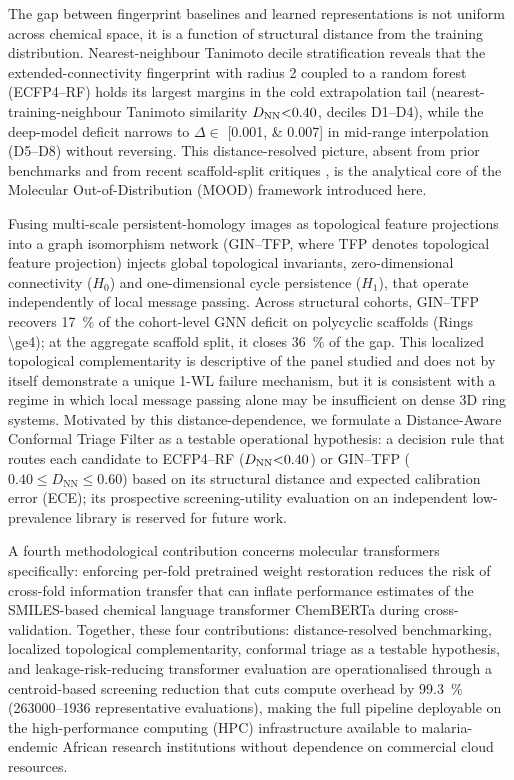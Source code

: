 \documentclass[11pt,a4paper]{article}
\begin{document}
The gap between fingerprint baselines and learned representations is not uniform across chemical space, it is a function of structural distance from the training distribution. Nearest-neighbour Tanimoto decile stratification reveals that the extended-connectivity fingerprint with radius \num{2} coupled to a random forest (ECFP4--RF) holds its largest margins in the cold extrapolation tail (nearest-training-neighbour Tanimoto similarity $D_{\mathrm{NN}}\num{<0.40}$, deciles D1--D4), while the deep-model deficit narrows to $\Delta \in$ [\numlist{0.001; 0.007}] in mid-range interpolation (D5--D8) without reversing. This distance-resolved picture, absent from prior benchmarks \citep{guo_ding_2026,benchmark_pretrained_2025} and from recent scaffold-split critiques \citep{guo2024scaffold,scaffold_frontier_2026}, is the analytical core of the Molecular Out-of-Distribution (MOOD) framework introduced here.

Fusing multi-scale persistent-homology images \citep{adams2017persistence} as topological feature projections into a graph isomorphism network (GIN--TFP, where TFP denotes topological feature projection) injects global topological invariants, zero-dimensional connectivity ($H_0$) and one-dimensional cycle persistence ($H_1$), that operate independently of local message passing. Across structural cohorts, GIN--TFP recovers \qty{17}{\percent} of the cohort-level GNN deficit on polycyclic scaffolds (Rings \num{\ge4}); at the aggregate scaffold split, it closes \qty{36}{\percent} of the gap. This localized topological complementarity is descriptive of the panel studied and does not by itself demonstrate a unique 1-WL failure mechanism, but it is consistent with a regime in which local message passing alone may be insufficient on dense 3D ring systems. Motivated by this distance-dependence, we formulate a Distance-Aware Conformal Triage Filter as a testable operational hypothesis: a decision rule that routes each candidate to ECFP4--RF ($D_{\mathrm{NN}}\num{<0.40}$) or GIN--TFP ($\num{0.40} \le D_{\mathrm{NN}} \le \num{0.60}$) based on its structural distance and expected calibration error (ECE); its prospective screening-utility evaluation on an independent low-prevalence library is reserved for future work.

A fourth methodological contribution concerns molecular transformers specifically: enforcing per-fold pretrained weight restoration reduces the risk of cross-fold information transfer that can inflate performance estimates of the SMILES-based chemical language transformer ChemBERTa during cross-validation. Together, these four contributions: distance-resolved benchmarking, localized topological complementarity, conformal triage as a testable hypothesis, and leakage-risk-reducing transformer evaluation are operationalised through a centroid-based screening reduction that cuts compute overhead by \qty{99.3}{\percent} (\numrange{263000}{1936} representative evaluations), making the full pipeline deployable on the high-performance computing (HPC) infrastructure available to malaria-endemic African research institutions without dependence on commercial cloud resources.
\end{document}
